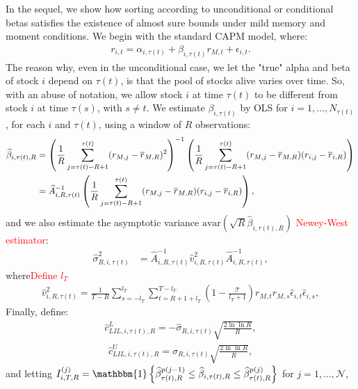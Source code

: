 In the sequel, we show how sorting according to unconditional or conditional betas satisfies the existence of almost sure bounds under mild memory and moment conditions. We begin with the standard CAPM model, where:
\begin{align}
r_{i,t} = \alpha_{i,\tau(t)} + \beta_{i, \tau(t)} r_{M,t} + \epsilon_{i,t}.
\end{align}
The reason why, even in the unconditional case, we let the "true" alpha and beta of stock $i$ depend on $\tau(t)$, is that the pool of stocks alive varies over time. So, with an abuse of notation, we allow stock $i$ at time $\tau(t)$ to be different from stock $i$ at time $\tau(s)$, with $s \neq t$. We estimate $\beta_{i, \tau(t)}$ by OLS for $i = 1, \dots , N_{\tau(t)}$, for each $i$ and $\tau(t)$, using a window of $R$ observations:
\begin{align}
\widehat{\beta}_{i, \tau(t), R} &= \left( \frac{1}{R} \sum_{j=\tau(t) - R + 1}^{\tau(t)} (r_{M,j} - \overline{r}_{M,R})^2 \right)^{-1} \left( \frac{1}{R} \sum_{j=\tau(t) - R + 1}^{\tau(t)} (r_{M,j} - \overline{r}_{M,R})(r_{i,j} - \overline{r}_{i,R}) \right) \\
&= \widehat{A}_{i,R, \tau(t)}^{-1} \left( \frac{1}{R} \sum_{j=\tau(t) - R + 1}^{\tau(t)} (r_{M,j} - \overline{r}_{M,R})(r_{i,j} - \overline{r}_{i,R}) \right), \notag
\end{align}
and we also estimate the asymptotic variance $\text{avar} \left( \sqrt{R} \widehat{\beta}_{i, \tau(t), R} \right)$ \textcolor{red}{Newey-West estimator}:
\begin{align}
\widehat{\sigma}_{R,i, \tau(t)}^2 &= \widehat{A}_{i,R, \tau(t)}^{-1} \widehat{v}_{i,R, \tau(t)}^2 \widehat{A}_{i,R, \tau(t)}^{-1}, 
\end{align} 
where\textcolor{red}{Define $l_T$}
\begin{align}
\widehat{v}_{i,R, \tau(t)}^2 = \frac{1}{T - R} \sum_{s=-l_T}^{l_T} \sum_{t=R+1+l_T}^{T-l_T} \left( 1 - \frac{\mathcal{T}}{l_T + 1} \right) r_{M,t} r_{M,s} \widehat{\epsilon}_{i,t} \widehat{\epsilon}_{i,s},
\end{align}
Finally, define:
\begin{align}
\widehat{c}_{LIL, i, \tau(t), R}^L = -\widehat{\sigma}_{R,i, \tau(t)} \sqrt{\frac{2 \ln \ln R}{R}},
\end{align}
\begin{align}
\widehat{c}_{LIL, i, \tau(t), R}^U = \widehat{\sigma}_{R,i, \tau(t)} \sqrt{\frac{2 \ln \ln R}{R}},
\end{align}
and letting $I^{(j)}_{i,T,R} = \mathbbm{1} \left\{ \widehat{\beta}_{\tau(t), R}^{p(j-1)} \leq \widehat{\beta}_{i, \tau(t), R} \leq \widehat{\beta}_{\tau(t), R}^{p(j)} \right\}$ for $j = 1, \dots, \mathcal{N}$,

